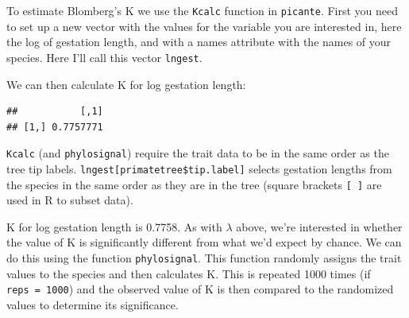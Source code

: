 \documentclass[]{book}
\newenvironment{Shaded}{\begin{snugshade}}{\end{snugshade}}
\newcommand{\KeywordTok}[1]{\textcolor[rgb]{0.13,0.29,0.53}{\textbf{{#1}}}}
\newcommand{\DataTypeTok}[1]{\textcolor[rgb]{0.13,0.29,0.53}{{#1}}}
\newcommand{\DecValTok}[1]{\textcolor[rgb]{0.00,0.00,0.81}{{#1}}}
\newcommand{\StringTok}[1]{\textcolor[rgb]{0.31,0.60,0.02}{{#1}}}
\newcommand{\NormalTok}[1]{{#1}}
\begin{document}
To estimate Blomberg's K we use the \texttt{Kcalc} function in
\texttt{picante}. First you need to set up a new vector with the values
for the variable you are interested in, here the log of gestation
length, and with a names attribute with the names of your species. Here
I'll call this vector \texttt{lngest}.

\begin{Shaded}
\end{Shaded}

We can then calculate K for log gestation length:

\begin{Shaded}
\end{Shaded}

\begin{verbatim}
##           [,1]
## [1,] 0.7757771
\end{verbatim}

\texttt{Kcalc} (and \texttt{phylosignal}) require the trait data to be
in the same order as the tree tip labels.
\texttt{lngest{[}primatetree\$tip.label{]}} selects gestation lengths
from the species in the same order as they are in the tree (square
brackets \texttt{{[}\ {]}} are used in R to subset data).

K for log gestation length is 0.7758. As with \(\lambda\) above, we're
interested in whether the value of K is significantly different from
what we'd expect by chance. We can do this using the function
\texttt{phylosignal}. This function randomly assigns the trait values to
the species and then calculates K. This is repeated 1000 times (if
\texttt{reps\ =\ 1000}) and the observed value of K is then compared to
the randomized values to determine its significance.

\begin{Shaded}
\end{Shaded}
\end{document}
